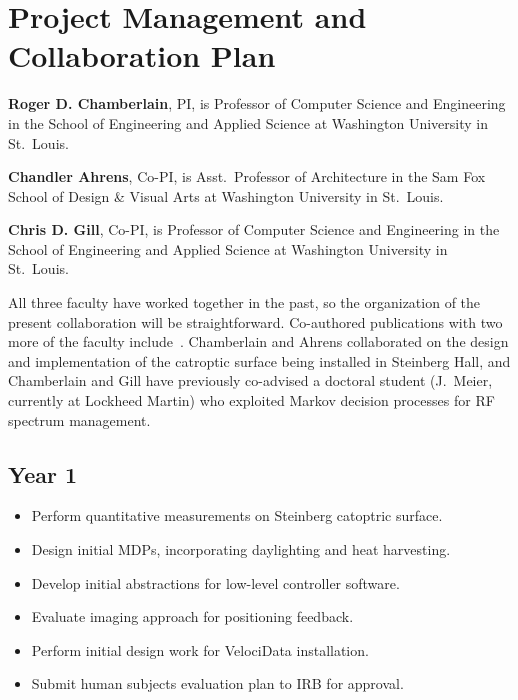 \section{Project Management and Collaboration Plan}
\label{sec:collab}


{\bf Roger D. Chamberlain}, PI, is Professor of Computer Science
and Engineering in the School of Engineering and Applied Science
at Washington University in St.~Louis.

{\bf Chandler Ahrens}, Co-PI, is Asst.~Professor of Architecture
in the Sam Fox School of Design \& Visual Arts
at Washington University in St.~Louis.

{\bf Chris D. Gill}, Co-PI, is Professor of Computer Science
and Engineering in the School of Engineering and Applied Science
at Washington University in St.~Louis.

All three faculty have worked together in the past, so the organization
of the present collaboration will be straightforward.  Co-authored
publications with two more of the faculty
include~\cite{cag18,mgc16, mskgct13}. Chamberlain and Ahrens collaborated
on the design and implementation of the catroptic surface being
installed in Steinberg Hall, and Chamberlain and Gill have previously
co-advised a doctoral student (J.~Meier, currently at Lockheed Martin)
who exploited Markov decision processes for RF spectrum management.



\subsection*{Year 1}

\begin{itemize}

\item Perform quantitative measurements on Steinberg catoptric surface.

\item Design initial MDPs, incorporating daylighting and heat harvesting.

\item Develop initial abstractions for low-level controller software.

\item Evaluate imaging approach for positioning feedback.

\item Perform initial design work for VelociData installation.

\item Submit human subjects evaluation plan to IRB for approval.

\end{itemize}

